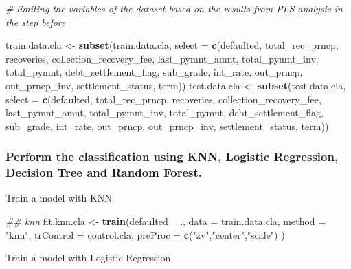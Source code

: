 \documentclass[]{article}
\newenvironment{Shaded}{\begin{snugshade}}{\end{snugshade}}
\newcommand{\CommentTok}[1]{\textcolor[rgb]{0.56,0.35,0.01}{\textit{#1}}}
\newcommand{\DataTypeTok}[1]{\textcolor[rgb]{0.13,0.29,0.53}{#1}}
\newcommand{\KeywordTok}[1]{\textcolor[rgb]{0.13,0.29,0.53}{\textbf{#1}}}
\newcommand{\NormalTok}[1]{#1}
\newcommand{\OperatorTok}[1]{\textcolor[rgb]{0.81,0.36,0.00}{\textbf{#1}}}
\newcommand{\StringTok}[1]{\textcolor[rgb]{0.31,0.60,0.02}{#1}}
\begin{document}
\begin{Shaded}
\begin{Highlighting}[]
\CommentTok{# limiting the variables of the dataset based on the results from PLS analysis in the step before}

\NormalTok{train.data.cla <-}\StringTok{ }\KeywordTok{subset}\NormalTok{(train.data.cla, }\DataTypeTok{select =} \KeywordTok{c}\NormalTok{(defaulted, total_rec_prncp, recoveries, collection_recovery_fee, last_pymnt_amnt, total_pymnt_inv, total_pymnt, debt_settlement_flag, sub_grade, int_rate, out_prncp, out_prncp_inv, settlement_status, term))}
\NormalTok{test.data.cla  <-}\StringTok{ }\KeywordTok{subset}\NormalTok{(test.data.cla, }\DataTypeTok{select =} \KeywordTok{c}\NormalTok{(defaulted, total_rec_prncp, recoveries, collection_recovery_fee, last_pymnt_amnt, total_pymnt_inv, total_pymnt, debt_settlement_flag, sub_grade, int_rate, out_prncp, out_prncp_inv, settlement_status, term))}
\end{Highlighting}
\end{Shaded}

\hypertarget{perform-the-classification-using-knn-logistic-regression-decision-tree-and-random-forest.}{%
\subsubsection{Perform the classification using KNN, Logistic
Regression, Decision Tree and Random
Forest.}\label{perform-the-classification-using-knn-logistic-regression-decision-tree-and-random-forest.}}

Train a model with KNN

\begin{Shaded}
\begin{Highlighting}[]
\CommentTok{## knn}
\NormalTok{fit.knn.cla  <-}\StringTok{ }\KeywordTok{train}\NormalTok{(defaulted }\OperatorTok{~}\StringTok{ }\NormalTok{., }
                \DataTypeTok{data =}\NormalTok{ train.data.cla, }
                \DataTypeTok{method =} \StringTok{"knn"}\NormalTok{,}
                \DataTypeTok{trControl =}\NormalTok{ control.cla,}
                \DataTypeTok{preProc =} \KeywordTok{c}\NormalTok{(}\StringTok{"zv"}\NormalTok{,}\StringTok{"center"}\NormalTok{,}\StringTok{"scale"}\NormalTok{)}
\NormalTok{                ) }
\end{Highlighting}
\end{Shaded}

Train a model with Logistic Regression
\end{document}
